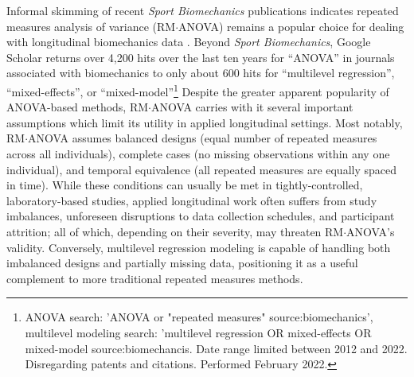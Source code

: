 \documentclass[
]{article}
\begin{document}
Informal skimming of recent \emph{Sport Biomechanics} publications indicates repeated measures analysis of variance (RM\(\cdot\)ANOVA) remains a popular choice for dealing with longitudinal biomechanics data \cite{liao2021, mueske2018, nojiri2019, stronska2020}. Beyond \emph{Sport Biomechanics}, Google Scholar returns over 4,200 hits over the last ten years for ``ANOVA'' in journals associated with biomechanics to only about 600 hits for ``multilevel regression'', ``mixed-effects'', or ``mixed-model''\footnote{ANOVA search: 'ANOVA or "repeated measures" source:biomechanics', multilevel modeling search: 'multilevel regression OR mixed-effects OR mixed-model source:biomechancis. Date range limited between 2012 and 2022. Disregarding patents and citations. Performed February 2022.} Despite the greater apparent popularity of ANOVA-based methods, RM\(\cdot\)ANOVA carries with it several important assumptions which limit its utility in applied longitudinal settings. Most notably, RM\(\cdot\)ANOVA assumes balanced designs (equal number of repeated measures across all individuals), complete cases (no missing observations within any one individual), and temporal equivalence (all repeated measures are equally spaced in time). While these conditions can usually be met in tightly-controlled, laboratory-based studies, applied longitudinal work often suffers from study imbalances, unforeseen disruptions to data collection schedules, and participant attrition; all of which, depending on their severity, may threaten RM\(\cdot\)ANOVA's validity. Conversely, multilevel regression modeling is capable of handling both imbalanced designs and partially missing data, positioning it as a useful complement to more traditional repeated measures methods.
\end{document}
